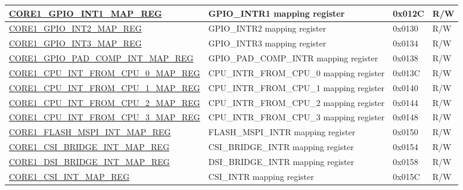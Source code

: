 \begin{longtable}{ | p{7.5cm} | p{7.2cm} | p{1.3cm} | p{1cm} | }
\hyperref[regdesc:CORE1GPIOINT1MAPREG]{CORE1\_GPIO\_INT1\_MAP\_REG} & GPIO\_INTR1 mapping register & 0x012C & R/W \\ \hline

\hyperref[regdesc:CORE1GPIOINT2MAPREG]{CORE1\_GPIO\_INT2\_MAP\_REG} & GPIO\_INTR2 mapping register & 0x0130 & R/W \\ \hline

\hyperref[regdesc:CORE1GPIOINT3MAPREG]{CORE1\_GPIO\_INT3\_MAP\_REG} & GPIO\_INTR3 mapping register & 0x0134 & R/W \\ \hline

\hyperref[regdesc:CORE1GPIOPADCOMPINTMAPREG]{CORE1\_GPIO\_PAD\_COMP\_INT\_MAP\_REG} & GPIO\_PAD\_COMP\_INTR mapping register & 0x0138 & R/W \\ \hline

\hyperref[regdesc:CORE1CPUINTFROMCPU0MAPREG]{CORE1\_CPU\_INT\_FROM\_CPU\_0\_MAP\_REG} & CPU\_INTR\_FROM\_CPU\_0 mapping register & 0x013C & R/W \\ \hline

\hyperref[regdesc:CORE1CPUINTFROMCPU1MAPREG]{CORE1\_CPU\_INT\_FROM\_CPU\_1\_MAP\_REG} & CPU\_INTR\_FROM\_CPU\_1 mapping register & 0x0140 & R/W \\ \hline

\hyperref[regdesc:CORE1CPUINTFROMCPU2MAPREG]{CORE1\_CPU\_INT\_FROM\_CPU\_2\_MAP\_REG} & CPU\_INTR\_FROM\_CPU\_2 mapping register & 0x0144 & R/W \\ \hline

\hyperref[regdesc:CORE1CPUINTFROMCPU3MAPREG]{CORE1\_CPU\_INT\_FROM\_CPU\_3\_MAP\_REG} & CPU\_INTR\_FROM\_CPU\_3 mapping register & 0x0148 & R/W \\ \hline


\hyperref[regdesc:CORE1FLASHMSPIINTMAPREG]{CORE1\_FLASH\_MSPI\_INT\_MAP\_REG} & FLASH\_MSPI\_INTR mapping register & 0x0150 & R/W \\ \hline

\hyperref[regdesc:CORE1CSIBRIDGEINTMAPREG]{CORE1\_CSI\_BRIDGE\_INT\_MAP\_REG} & CSI\_BRIDGE\_INTR mapping register & 0x0154 & R/W \\ \hline

\hyperref[regdesc:CORE1DSIBRIDGEINTMAPREG]{CORE1\_DSI\_BRIDGE\_INT\_MAP\_REG} & DSI\_BRIDGE\_INTR mapping register & 0x0158 & R/W \\ \hline

\hyperref[regdesc:CORE1CSIINTMAPREG]{CORE1\_CSI\_INT\_MAP\_REG} & CSI\_INTR mapping register & 0x015C & R/W \\ \hline


\end{longtable}
